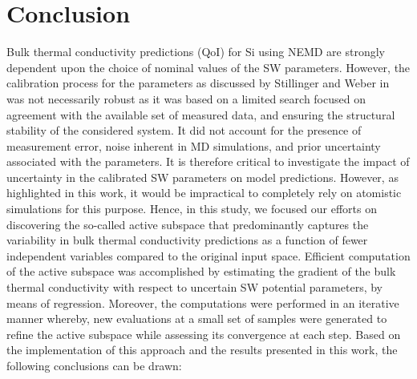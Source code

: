 \section{Conclusion}
\label{sec:conc}

Bulk thermal conductivity predictions (QoI) for Si using NEMD are strongly dependent upon the
choice of nominal values of the SW parameters. However, the calibration process for the
parameters as discussed by Stillinger and Weber in~\cite{Stillinger:1985} was not
necessarily robust as it was based on a limited search focused on agreement with the 
available set of measured data, and ensuring the structural stability of the considered system. 
It did not account for the presence of measurement error, noise inherent in MD simulations,
and prior uncertainty associated with the parameters. It is therefore critical to
investigate the impact of uncertainty in the calibrated SW parameters on model predictions.
However, as highlighted in this work, it would be impractical to completely rely on
atomistic simulations for this purpose. Hence, in this study, we focused our efforts on
discovering the so-called active subspace that predominantly captures the variability
in bulk thermal conductivity predictions as a function of fewer independent variables
compared to the original input space. Efficient computation of the active subspace
was accomplished by estimating the gradient of the bulk thermal conductivity with
respect to uncertain SW potential parameters, by means of regression. Moreover, the
computations were performed in an iterative manner whereby, new evaluations at a 
small set of samples were generated to refine the active subspace while assessing 
its convergence at each step.
Based on the implementation of this approach and the results
presented in this work, the following conclusions can be drawn:
%
